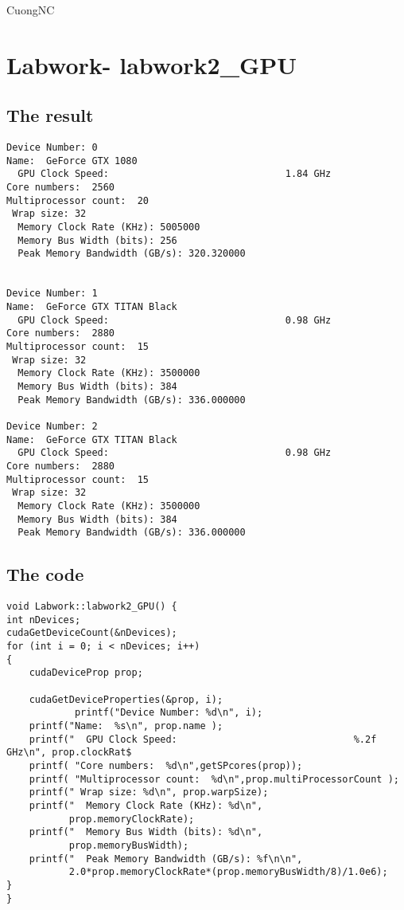 \documentclass{article}
\begin{document}
CuongNC

\section{Labwork- labwork2\_GPU}
\subsection{The result}

\begin{lstlisting}
Device Number: 0
Name:  GeForce GTX 1080
  GPU Clock Speed:                               1.84 GHz
Core numbers:  2560
Multiprocessor count:  20
 Wrap size: 32
  Memory Clock Rate (KHz): 5005000
  Memory Bus Width (bits): 256
  Peak Memory Bandwidth (GB/s): 320.320000


Device Number: 1
Name:  GeForce GTX TITAN Black
  GPU Clock Speed:                               0.98 GHz
Core numbers:  2880
Multiprocessor count:  15
 Wrap size: 32
  Memory Clock Rate (KHz): 3500000
  Memory Bus Width (bits): 384
  Peak Memory Bandwidth (GB/s): 336.000000

Device Number: 2
Name:  GeForce GTX TITAN Black
  GPU Clock Speed:                               0.98 GHz
Core numbers:  2880
Multiprocessor count:  15
 Wrap size: 32
  Memory Clock Rate (KHz): 3500000
  Memory Bus Width (bits): 384
  Peak Memory Bandwidth (GB/s): 336.000000

\end{lstlisting}


\subsection{The code}
\begin{lstlisting}
void Labwork::labwork2_GPU() {
int nDevices;
cudaGetDeviceCount(&nDevices);
for (int i = 0; i < nDevices; i++)
{
    cudaDeviceProp prop;

    cudaGetDeviceProperties(&prop, i);
            printf("Device Number: %d\n", i);
    printf("Name:  %s\n", prop.name );
    printf("  GPU Clock Speed:                               %.2f GHz\n", prop.clockRat$
    printf( "Core numbers:  %d\n",getSPcores(prop));
    printf( "Multiprocessor count:  %d\n",prop.multiProcessorCount );
    printf(" Wrap size: %d\n", prop.warpSize);
    printf("  Memory Clock Rate (KHz): %d\n",
           prop.memoryClockRate);
    printf("  Memory Bus Width (bits): %d\n",
           prop.memoryBusWidth);
    printf("  Peak Memory Bandwidth (GB/s): %f\n\n",
           2.0*prop.memoryClockRate*(prop.memoryBusWidth/8)/1.0e6);
}
}
\end{lstlisting}
\end{document}
